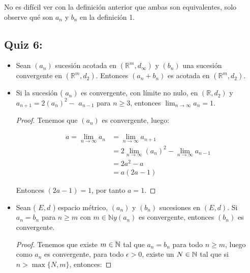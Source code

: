 \begin{itemize}[leftmargin=*]
\begin{definition}
\end{definition}

No es difícil ver con la definición anterior que ambas son equivalentes, solo observe qué son $a_n$ y $b_n$ en la definición 1.

\subsection{Quiz 6:}

\end{itemize}

\begin{itemize}[leftmargin=*]
    \item  Sean $\left(a_n\right)$ sucesión acotada en $\left(\mathbb{R}^m, d_{\infty}\right)$ y $\left(b_n\right)$ una sucesión convergente en $\left(\mathbb{R}^m, d_2\right)$. Entonces $\left(a_n+b_n\right)$ es acotada en $\left(\mathbb{R}^m, d_2\right)$.\\

    \item Si la sucesión ( $\left.a_n\right)$ es convergente, con límite no nulo, en $\left(\mathbb{R}, d_2\right)$ y $a_{n+1}=2\left(a_n\right)^2-$ $a_{n-1}$ para $n \geq 3$, entonces $\operatorname{lim}_{n \rightarrow \infty} a_n=1$.\\

    \begin{proof}
    Tenemos que $(a_n)$ es convergente, luego:

    \begin{align*}
        a=\lim_{n \to \infty} a_n&=\lim_{n \to \infty} a_{n+1}\\
        &=2\lim_{n \to \infty}(a_n)^2-\lim_{n \to \infty} a_{n-1}\\
        &=2a^2-a\\
        &=a(2a-1)
    \end{align*}
    
    Entonces $(2a-1)=1$, por tanto $a=1$.
    \end{proof}


    \item Sean ( $E, d$ ) espacio métrico, $\left(a_n\right)$ y $\left(b_n\right)$ sucesiones en $(E, d)$. Si $a_n=b_n$ para $n \geq m$ con $m \in \mathbb{N} y\left(a_n\right)$ es convergente, entonces $\left(b_n\right)$ es convergente.\\

    \begin{proof}
    Tenemos que existe $m\in \mathbb{N}$ tal que $a_n=b_n$ para todo $n\geq m$, luego como $a_n$ es convergente, para todo $\epsilon>0$, existe un $N\in \mathbb{N}$ tal que si $n>\max\{N,m\}$, entonces:


\end{proof}
\end{itemize}
